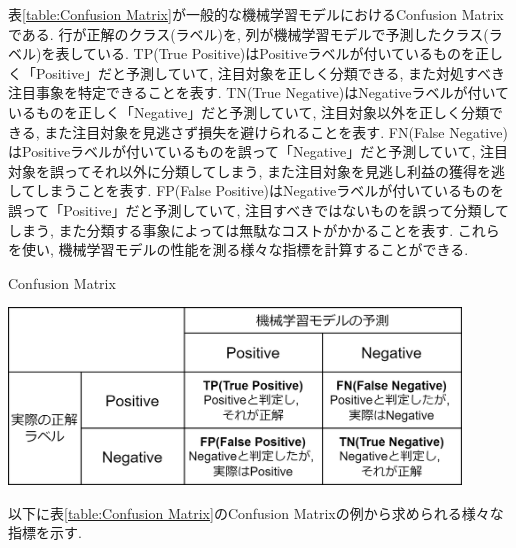 \documentclass{ltjarticle}
\begin{document}
表\ref{table:Confusion Matrix}が一般的な機械学習モデルにおけるConfusion Matrixである. 行が正解のクラス(ラベル)を, 列が機械学習モデルで予測したクラス(ラベル)を表している. 
TP(True Positive)はPositiveラベルが付いているものを正しく「Positive」だと予測していて, 注目対象を正しく分類できる, また対処すべき注目事象を特定できることを表す. 
TN(True Negative)はNegativeラベルが付いているものを正しく「Negative」だと予測していて, 注目対象以外を正しく分類できる, また注目対象を見逃さず損失を避けられることを表す. 
FN(False Negative)はPositiveラベルが付いているものを誤って「Negative」だと予測していて, 注目対象を誤ってそれ以外に分類してしまう, また注目対象を見逃し利益の獲得を逃してしまうことを表す. 
FP(False Positive)はNegativeラベルが付いているものを誤って「Positive」だと予測していて, 注目すべきではないものを誤って分類してしまう, また分類する事象によっては無駄なコストがかかることを表す. 
これらを使い, 機械学習モデルの性能を測る様々な指標を計算することができる. 
\vspace{10truept}

\begin{table}[h]
    \centering
    \caption{Confusion Matrix}
    \vspace{5truept}

    \includegraphics[width = 12cm]{images/Confusion_Matrix.drawio.png}
    \label{table:Confusion Matrix}
\end{table}
\vspace{5truept}

\noindent
以下に表\ref{table:Confusion Matrix}のConfusion Matrixの例から求められる様々な指標を示す. 
\vspace{10truept}
\end{document}
